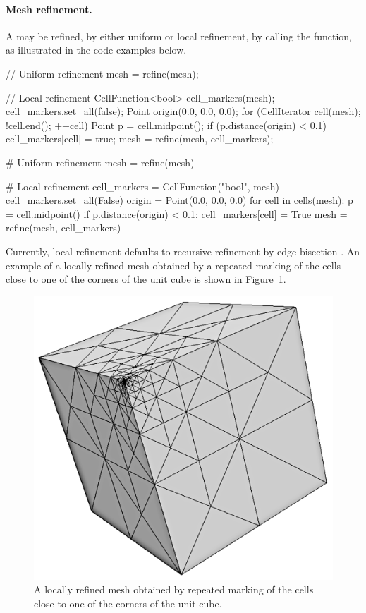 \paragraph{Mesh refinement.}

A  may be refined, by either uniform or local refinement, by
calling the  function, as illustrated in the code examples
below.
\begin{c++}
// Uniform refinement
mesh = refine(mesh);

// Local refinement
CellFunction<bool> cell_markers(mesh);
cell_markers.set_all(false);
Point origin(0.0, 0.0, 0.0);
for (CellIterator cell(mesh); !cell.end(); ++cell)
{
  Point p = cell.midpoint();
  if (p.distance(origin) < 0.1)
    cell_markers[cell] = true;
}
mesh = refine(mesh, cell_markers);
\end{c++}
\begin{python}
# Uniform refinement
mesh = refine(mesh)

# Local refinement
cell_markers = CellFunction("bool", mesh)
cell_markers.set_all(False)
origin = Point(0.0, 0.0, 0.0)
for cell in cells(mesh):
    p = cell.midpoint()
    if p.distance(origin) < 0.1:
        cell_markers[cell] = True
mesh = refine(mesh, cell_markers)
\end{python}
Currently, local refinement defaults to recursive refinement by edge
bisection \citep{Rivara1984,Rivara1992}. An example of a locally refined
mesh obtained by a repeated marking of the cells close to one of the
corners of the unit cube is shown in Figure~\ref{fig:logg-2:refinement}.

\begin{figure}
  \centering
  \includegraphics[width=\smallfig]{chapters/logg-2/png/refined_cube.png}
  \caption{A locally refined mesh obtained by repeated marking of the
    cells close to one of the corners of the unit cube.}
  \label{fig:logg-2:refinement}
\end{figure}

